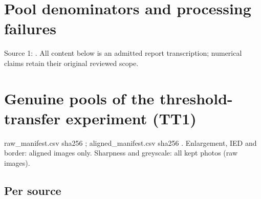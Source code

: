 \documentclass[10pt,twocolumn,letterpaper]{article}
\begin{document}

\clearpage
\section{Pool denominators and processing failures}
\noindent Source 1: \protect{}. All content below is an admitted report transcription; numerical claims retain their original reviewed scope.

\section{Genuine pools of the threshold-transfer experiment (TT1)}\label{genuine-pools-of-the-threshold-transfer-experiment-tt1}

raw\_manifest.csv sha256 \protect{}; aligned\_manifest.csv sha256 \protect{}. Enlargement, IED and border: aligned images only. Sharpness and greyscale: all kept photos (raw images).

\subsection{Per source}\label{per-source}
\end{document}
